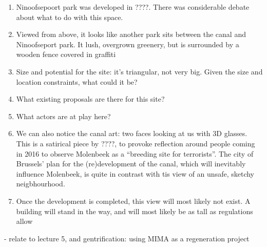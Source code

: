 \documentclass{article}[11pt]
\begin{document}
\begin{enumerate}
	\item Ninoofsepoort park was developed in ????. There was considerable debate about what to do with this space.
	\\ 
	\item Viewed from above, it looks like another park sits between the canal and Ninoofseport park. It lush, overgrown greenery, but is surrounded by a wooden fence covered in graffiti 
	\item Size and potential for the site: it's triangular, not very big. Given the size and location constraints, what could it be?
	\item What existing proposals are there for this site?
	\item What actors are at play here?
	\item We can also notice the canal art: two faces looking at us with 3D glasses. This is a satirical piece by ????, to provoke reflection around people coming in 2016 to observe Molenbeek as a ``breeding site for terrorists''. The city of Brussels' plan for the (re)development of the canal, which will inevitably influence Molenbeek, is quite in contrast with tis view of an unsafe, sketchy neigbhourhood.
	\item Once the development is completed, this view will most likely not exist. A building will stand in the way, and will most likely be as tall as regulations allow
	
\end{enumerate}

- relate to lecture 5, and gentrification: using MIMA as a regeneration project

\pagebreak

\printbibliography 
\end{document}
